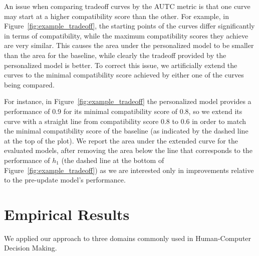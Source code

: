 \documentclass[letterpaper]{article} %
\theoremstyle{definition}
\newcommand{\kibitz}[2]{\ifnum\Comments=1{\color{#1}{#2}}\fi}
\newcommand{\li}[1]{\kibitz{brown}{[LL:#1]}}
\begin{document}
An issue when comparing tradeoff curves by the AUTC metric is that one curve may start at a higher compatibility score than the other.
For example, in Figure~\ref{fig:example_tradeoff}, the starting points of the curves differ significantly in terms of compatibility, while the maximum compatibility scores they achieve are very similar.
This causes the area under the personalized model to be smaller than the area for the baseline, while clearly the tradeoff provided by the personalized model is better.
To correct this issue, we artificially extend the curves to the minimal compatibility score achieved by either one of the curves being compared.

For instance, in  Figure~\ref{fig:example_tradeoff} the personalized model provides a performance of 0.9 for its minimal compatibility score of 0.8, so we extend its curve with a straight line from compatibility score 0.8 to 0.6 in order to match the minimal compatibility score of the baseline (as indicated by the dashed line at the top of the plot). We report the area under the extended curve for the evaluated models, after removing the area below the line that corresponds to the performance of $h_1$ (the dashed line at the bottom of Figure~\ref{fig:example_tradeoff}) as we are interested only in improvements relative to the pre-update model's performance.












\section{Empirical Results}
\label{sec:results}

We applied our approach to three domains  commonly  used  in
Human-Computer Decision Making. \li{Why capitalize Human-Computer Decision-Making?}
\end{document}
